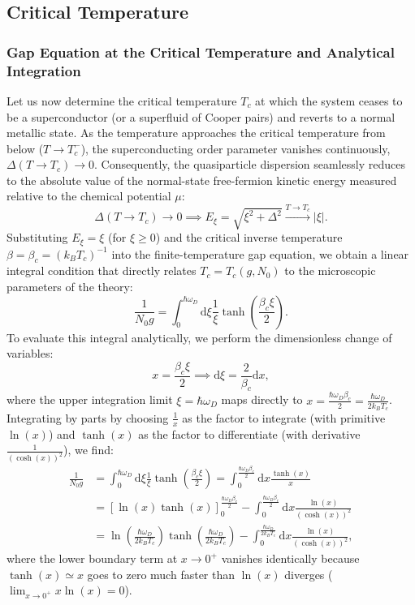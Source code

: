 \subsection{Critical Temperature}

\subsubsection{Gap Equation at the Critical Temperature and Analytical Integration}

Let us now determine the critical temperature \( T_c \) at which the system ceases to be a superconductor (or a superfluid of Cooper pairs) and reverts to a normal metallic state. As the temperature approaches the critical temperature from below (\( T \to T_c^- \)), the superconducting order parameter vanishes continuously, \( \Delta(T \to T_c) \to 0 \). Consequently, the quasiparticle dispersion seamlessly reduces to the absolute value of the normal-state free-fermion kinetic energy measured relative to the chemical potential \( \mu \):
\[
    \Delta(T \to T_c) \to 0 \implies E_\xi = \sqrt{\xi^2 + \Delta^2} \xrightarrow{T \to T_c} |\xi|.
\]
Substituting \( E_\xi = \xi \) (for \( \xi \ge 0 \)) and the critical inverse temperature \( \beta = \beta_c = (k_B T_c)^{-1} \) into the finite-temperature gap equation, we obtain a linear integral condition that directly relates \( T_c = T_c(g, N_0) \) to the microscopic parameters of the theory:
\[
    \frac{1}{N_0 g} = \int_0^{\hbar\omega_D} \mathrm{d}\xi \frac{1}{\xi} \tanh\left(\frac{\beta_c \xi}{2}\right).
\]
To evaluate this integral analytically, we perform the dimensionless change of variables:
\[
    x = \frac{\beta_c \xi}{2} \implies \mathrm{d}\xi = \frac{2}{\beta_c} \mathrm{d}x,
\]
where the upper integration limit \( \xi = \hbar\omega_D \) maps directly to \( x = \frac{\hbar\omega_D \beta_c}{2} = \frac{\hbar\omega_D}{2k_B T_c} \). Integrating by parts by choosing \( \frac{1}{x} \) as the factor to integrate (with primitive \( \ln(x) \)) and \( \tanh(x) \) as the factor to differentiate (with derivative \( \frac{1}{(\cosh(x))^2} \)), we find:
\[
    \begin{aligned}
        \frac{1}{N_0 g} & = \int_0^{\hbar\omega_D} \mathrm{d}\xi \frac{1}{\xi} \tanh\left(\frac{\beta_c \xi}{2}\right) = \int_0^{\frac{\hbar\omega_D \beta_c}{2}} \mathrm{d}x \frac{\tanh(x)}{x}                   \\
                        & = \left[ \ln(x) \tanh(x) \right]_0^{\frac{\hbar\omega_D \beta_c}{2}} - \int_0^{\frac{\hbar\omega_D \beta_c}{2}} \mathrm{d}x \frac{\ln(x)}{(\cosh(x))^2}                                  \\
                        & = \ln\left( \frac{\hbar\omega_D}{2k_B T_c} \right) \tanh\left( \frac{\hbar\omega_D}{2k_B T_c} \right) - \int_0^{\frac{\hbar\omega_D}{2k_B T_c}} \mathrm{d}x \frac{\ln(x)}{(\cosh(x))^2},
    \end{aligned}
\]
where the lower boundary term at \( x \to 0^+ \) vanishes identically because \( \tanh(x) \simeq x \) goes to zero much faster than \( \ln(x) \) diverges (\( \lim_{x \to 0^+} x \ln(x) = 0 \)).

